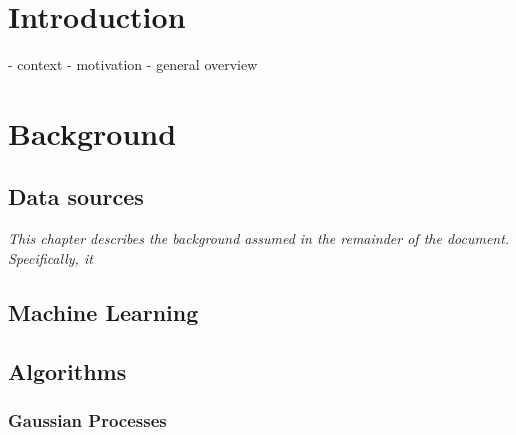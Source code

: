 \documentclass[a4paper,12pt,twoside,openright]{report}
\begin{document}
\pagestyle{empty}
\singlespacing

\onehalfspacing

\singlespacing


\setcounter{page}{0}
\pagestyle{plain}
\tableofcontents
\listoffigures
\listoftables

\onehalfspacing


\chapter{Introduction}
\setcounter{page}{1} 

- context
- motivation
- general overview





\chapter{Background}
\section{Data sources}


\textit{This chapter describes the background assumed in the remainder of the document. Specifically, it }
\section{Machine Learning}
\section{Algorithms}
\subsection{Gaussian Processes}
\end{document}
